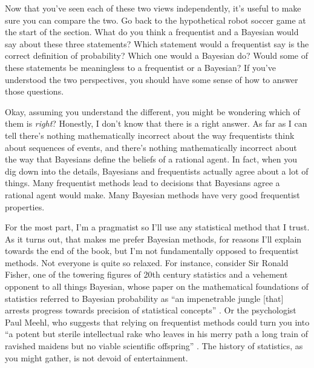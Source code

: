
Now that you've seen each of these two views independently, it's useful to make sure you can compare the two. Go back to the hypothetical robot soccer game at the start of the section. What do you think a frequentist and a Bayesian would say about these three statements? Which statement would a frequentist say is the correct definition of probability? Which one would a Bayesian do? Would some of these statements be meaningless to a frequentist or a Bayesian? If you've understood the two perspectives, you should have some sense of how to answer those questions.

Okay, assuming you understand the different, you might be wondering which of them is {\it right}? Honestly, I don't know that there is a right answer. As far as I can tell there's nothing mathematically incorrect about the way frequentists think about sequences of events, and there's nothing mathematically incorrect about the way that Bayesians define the beliefs of a rational agent. In fact, when you dig down into the details, Bayesians and frequentists actually agree about a lot of things. Many frequentist methods lead to decisions that Bayesians agree a rational agent would make. Many Bayesian methods have very good frequentist properties. 

For the most part, I'm a pragmatist so I'll use any statistical method that I trust. As it turns out, that makes me prefer Bayesian methods, for reasons I'll explain towards the end of the book, but I'm not fundamentally opposed to frequentist methods. Not everyone is quite so relaxed. For instance, consider Sir Ronald Fisher, one of the towering figures of 20th century statistics and a vehement opponent to all things Bayesian, whose paper on the mathematical foundations of statistics referred to Bayesian probability as ``an impenetrable jungle [that] arrests progress towards precision of statistical concepts'' \cite[p. 311]{Fisher1922b}. Or the psychologist Paul Meehl, who suggests that relying on frequentist methods could turn you into ``a potent but sterile intellectual rake who leaves in his merry path a long train of ravished maidens but no viable scientific offspring'' \cite[p. 114]{Meehl1967}. The history of statistics, as you might gather, is not devoid of entertainment.

